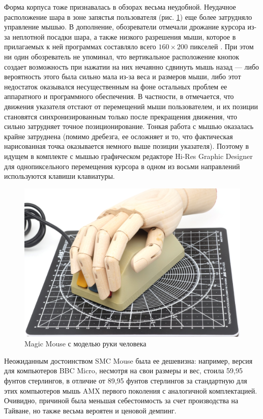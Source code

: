 \documentclass[11pt, a4paper]{article}
\begin{document}
Форма корпуса тоже признавалась в обзорах весьма неудобной. Неудачное расположение шара в зоне запястья пользователя (рис. \ref{fig:MagicMouseHand}) еще более затрудняло управление мышью. В дополнение, обозреватели отмечали дрожание курсора из-за неплотной посадки шара, а также низкого разрешения мыши, которое в прилагаемых к ней программах составляло всего $160 \times 200$ пикселей \cite{SMC_Mouse_Commodore3}. При этом ни один обозреватель не упоминал, что вертикальное расположение кнопок создает возможность при нажатии на них нечаянно сдвинуть мышь назад --- либо вероятность этого была сильно мала из-за веса и размеров мыши, либо этот недостаток оказывался несущественным на фоне остальных проблем ее аппаратного и программного обеспечения. В частности, в  \cite{SMC_Mouse_Commodore3} отмечается, что движения указателя отстают от перемещений мыши пользователем, и их позиции становятся синхронизированным только после прекращения движения, что сильно затрудняет точное позиционирование. Тонкая  работа с мышью оказалась крайне затруднена (помимо дребезга, ее осложняет и то, что фактическая нарисованная точка оказывается немного выше позиции указателя). Поэтому в идущем в комплекте с мышью графическом редакторе Hi-Res Graphic Designer для однопиксельного перемещения курсора в одном из восьми направлений используются клавиши клавиатуры.

\begin{figure}[h]
    \centering
    \includegraphics[scale=0.51]{1985_smc_contriver_magic_mouse/hand_30.jpg}
    \caption{Magic Mouse с моделью руки человека}
    \label{fig:MagicMouseHand}
\end{figure}

Неожиданным достоинством SMC Mouse была ее дешевизна: например, версия для компьютеров BBC Micro, несмотря на свои размеры и вес, стоила 59,95 фунтов стерлингов, в отличие от 89,95 фунтов стерлингов за стандартную для этих компьютеров мышь AMX первого поколения с аналогичной комплектацией. Очивидно, причиной была меньшая себестоимость за счет производства на Тайване, но также весьма вероятен и ценовой демпинг.
\end{document}

